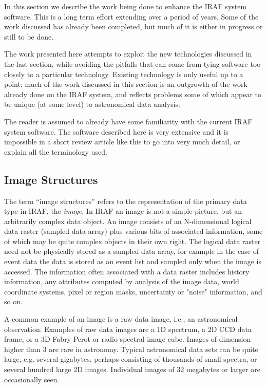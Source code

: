 In this section we describe the work being done to enhance the IRAF system
software.  This is a long term effort extending over a period of years.
Some of the work discussed has already been completed, but much of it is
either in progress or still to be done.

The work presented here attempts to exploit the new technologies discussed
in the last section, while avoiding the pitfalls that can come from tying
software too closely to a particular technology.  Existing technology is
only useful up to a point; much of the work discussed in this section is an
outgrowth of the work already done on the IRAF system, and reflects problems
some of which appear to be unique (at some level) to astronomical data
analysis.

The reader is assumed to already have some familiarity with the current IRAF
system software.  The software described here is very extensive and it is
impossible in a short review article like this to go into very much detail,
or explain all the terminology used.

\subsection {Image Structures}

The term ``image structures'' refers to the representation of the primary
data type in IRAF, the {\it image}.  In IRAF an image is not a simple
picture, but an arbitrarily complex data object.  An image consists of an
N-dimensional logical data raster (sampled data array) plus various bits of
associated information, some of which may be quite complex objects in their
own right.  The logical data raster need not be physically stored as a
sampled data array, for example in the case of event data the data is stored
as an event list and sampled only when the image is accessed.  The
information often associated with a data raster includes history
information, any attributes computed by analysis of the image data, world
coordinate systems, pixel or region masks, uncertainty or "noise"
information, and so on.

A common example of an image is a raw data image, i.e., an astronomical
observation.  Examples of raw data images are a 1D spectrum, a 2D CCD data
frame, or a 3D Fabry-Perot or radio spectral image cube.  Images of
dimension higher than 3 are rare in astronomy.  Typical astronomical data
sets can be quite large, e.g. several gigabytes, perhaps consisting of
thousands of small spectra, or several hundred large 2D images.  Individual
images of 32 megabytes or larger are occasionally seen.

